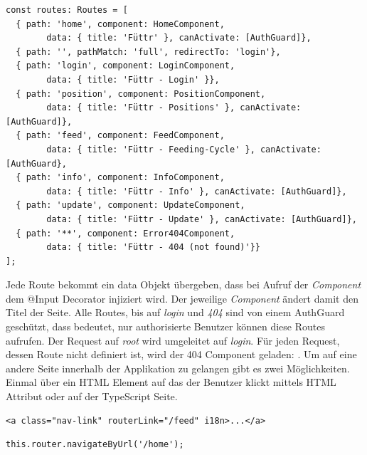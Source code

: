 \begin{lstlisting}[caption=Routes Definition,style=TS]
const routes: Routes = [
  { path: 'home', component: HomeComponent, 
  		data: { title: 'Füttr' }, canActivate: [AuthGuard]},
  { path: '', pathMatch: 'full', redirectTo: 'login'},
  { path: 'login', component: LoginComponent,
  		data: { title: 'Füttr - Login' }},
  { path: 'position', component: PositionComponent, 
  		data: { title: 'Füttr - Positions' }, canActivate: [AuthGuard]},
  { path: 'feed', component: FeedComponent, 
  		data: { title: 'Füttr - Feeding-Cycle' }, canActivate: [AuthGuard},
  { path: 'info', component: InfoComponent, 
  		data: { title: 'Füttr - Info' }, canActivate: [AuthGuard]},
  { path: 'update', component: UpdateComponent, 
  		data: { title: 'Füttr - Update' }, canActivate: [AuthGuard]},
  { path: '**', component: Error404Component, 
  		data: { title: 'Füttr - 404 (not found)'}}
];
\end{lstlisting}

Jede Route bekommt ein data Objekt übergeben, dass bei Aufruf der \textit{Component} dem @Input Decorator injiziert wird. Der jeweilige \textit{Component} ändert damit den Titel der Seite. Alle Routes, bis auf \textit{login} und \textit{404} sind von einem AuthGuard geschützt, dass bedeutet, nur authorisierte Benutzer können diese Routes aufrufen. Der Request auf \textit{root}  wird umgeleitet auf \textit{login}. Für jeden Request, dessen Route nicht definiert ist, wird der 404 Component geladen: . Um auf eine andere Seite innerhalb der Applikation zu gelangen gibt es zwei Möglichkeiten. Einmal über ein \ac{HTML} Element auf das der Benutzer klickt mittels \ac{HTML} Attribut  oder auf der TypeScript Seite.

\begin{lstlisting}[caption=Weiterleitung mittels \ac{HTML} Attributes,label=html-redirect,style=HTML]
<a class="nav-link" routerLink="/feed" i18n>...</a>
\end{lstlisting}

\begin{lstlisting}[caption=Weiterleiten mittels TypeScript,label=ts-redirect,style=TS]
this.router.navigateByUrl('/home');
\end{lstlisting}

